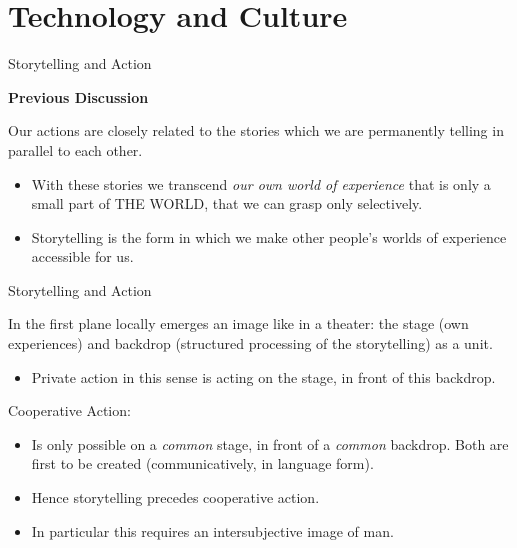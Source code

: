 \documentclass{beamer}
\title{Modelling Sustainable Systems\\ and Semantic Web\\[6pt] Information and
  Language \vskip1em}
\subtitle{Lecture in the Module 10-202-2309\\ for Master Computer Science}
\author{Prof. Dr. Hans-Gert Gräbe\\
\url{http://www.informatik.uni-leipzig.de/~graebe}}
\date{July 2021}
\newcommand{\ueberschrift}[1]{\begin{center}\bf #1\end{center}}
\begin{document}
{
\begin{frame}
  \titlepage
\end{frame}}

\section{Technology and Culture}
\begin{frame}{Storytelling and Action}

  \ueberschrift{Previous Discussion}
  
Our actions are closely related to the stories which we are permanently
telling in parallel to each other.
\begin{itemize}
\item With these stories we transcend \emph{our own world of experience} that
  is only a small part of THE WORLD, that we can grasp only selectively.
\item Storytelling is the form in which we make other people's worlds of
  experience accessible for us.
\end{itemize}
\end{frame}
\begin{frame}{Storytelling and Action}

In the first plane locally emerges an image like in a theater: the stage (own
experiences) and backdrop (structured processing of the storytelling) as a
unit.
\begin{itemize}
\item Private action in this sense is acting on the stage, in front of this
  backdrop.
\end{itemize}

Cooperative Action:
\begin{itemize}
\item Is only possible on a \emph{common} stage, in front of a \emph{common}
  backdrop. Both are first to be created (communicatively, in language form).
\item Hence storytelling precedes cooperative action.
\item In particular this requires an intersubjective image of man.
\end{itemize}
\end{frame}
\end{document}
